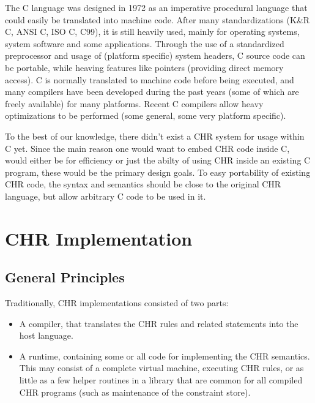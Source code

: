 \documentclass{llncs}
\begin{document}
The C language was designed in 1972 as an imperative procedural language that
could easily be translated into machine code. After many standardizations (K\&R C,
ANSI C, ISO C, C99), it is still heavily used, mainly for operating systems,
system software and some applications. Through the use of a standardized preprocessor
and usage of (platform specific) system headers, C source code can be portable,
while heaving features like pointers (providing direct memory access).
C is normally translated to machine code before being executed, and many compilers
have been developed during the past years (some of which are freely available) for
many platforms. Recent C compilers allow heavy optimizations to be performed (some
general, some very platform specific).

To the best of our knowledge, there didn't exist a CHR system for usage within C
yet. Since the main reason one would want to embed CHR code inside C, would either
be for efficiency or just the abilty of using CHR inside an existing C program,
these would be the primary design goals. To easy portability of existing CHR
code, the syntax and semantics should be close to the original CHR language, but
allow arbitrary C code to be used in it.

\section{CHR Implementation}

\subsection{General Principles}

Traditionally, CHR implementations consisted of two parts: \begin{itemize}
  \item A compiler, that translates the CHR rules and related statements into
        the host language.
  \item A runtime, containing some or all code for implementing the CHR semantics.
        This may consist of a complete virtual machine, executing CHR rules, 
	or as little as a few helper routines in a library that are common for
	all compiled CHR programs (such as maintenance of the constraint store).
\end{itemize}
	
\end{document}
